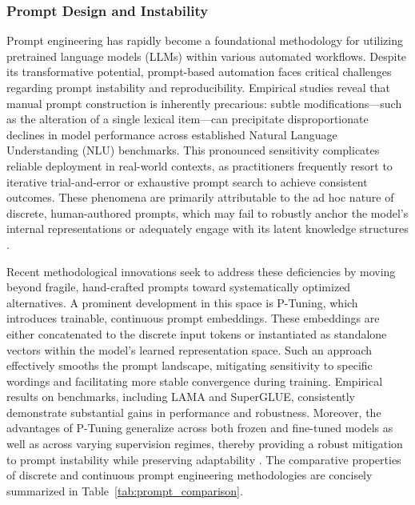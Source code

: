 \subsubsection{Prompt Design and Instability}

Prompt engineering has rapidly become a foundational methodology for utilizing pretrained language models (LLMs) within various automated workflows. Despite its transformative potential, prompt-based automation faces critical challenges regarding prompt instability and reproducibility. Empirical studies reveal that manual prompt construction is inherently precarious: subtle modifications---such as the alteration of a single lexical item---can precipitate disproportionate declines in model performance across established Natural Language Understanding (NLU) benchmarks. This pronounced sensitivity complicates reliable deployment in real-world contexts, as practitioners frequently resort to iterative trial-and-error or exhaustive prompt search to achieve consistent outcomes. These phenomena are primarily attributable to the ad hoc nature of discrete, human-authored prompts, which may fail to robustly anchor the model’s internal representations or adequately engage with its latent knowledge structures \cite{ref103}.

Recent methodological innovations seek to address these deficiencies by moving beyond fragile, hand-crafted prompts toward systematically optimized alternatives. A prominent development in this space is P-Tuning, which introduces trainable, continuous prompt embeddings. These embeddings are either concatenated to the discrete input tokens or instantiated as standalone vectors within the model’s learned representation space. Such an approach effectively smooths the prompt landscape, mitigating sensitivity to specific wordings and facilitating more stable convergence during training. Empirical results on benchmarks, including LAMA and SuperGLUE, consistently demonstrate substantial gains in performance and robustness. Moreover, the advantages of P-Tuning generalize across both frozen and fine-tuned models as well as across varying supervision regimes, thereby providing a robust mitigation to prompt instability while preserving adaptability \cite{ref103}. The comparative properties of discrete and continuous prompt engineering methodologies are concisely summarized in Table~\ref{tab:prompt_comparison}.

